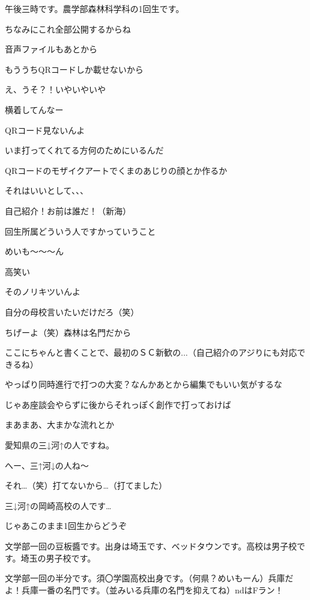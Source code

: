 \begin{multicols}{2}
  午後三時です。農学部森林科学科の1回生です。

  ちなみにこれ全部公開するからね

  音声ファイルもあとから

  もううちQRコードしか載せないから

  え、うそ？！いやいやいや

  横着してんなー

  QRコード見ないんよ

  いま打ってくれてる方何のためにいるんだ

  QRコードのモザイクアートでくまのあじりの顔とか作るか

  それはいいとして、、、

  自己紹介！お前は誰だ！（新海）

  回生所属どういう人ですかっていうこと

  めいも～～～ん

  高笑い

  そのノリキツいんよ

  自分の母校言いたいだけだろ（笑）

  ちげーよ（笑）森林は名門だから

  ここにちゃんと書くことで、最初のＳＣ新歓の...（自己紹介のアジりにも対応できるね）

  やっぱり同時進行で打つの大変？なんかあとから編集でもいい気がするな

  じゃあ座談会やらずに後からそれっぽく創作で打っておけば

  まあまあ、大まかな流れとか

  愛知県の三↓河↑の人ですね。

  へー、三↑河↓の人ね～

  それ…（笑）打てないから…（打てました）

  三↓河↑の岡崎高校の人です…

  じゃあこのまま1回生からどうぞ

  文学部一回の豆板醬です。出身は埼玉です、ベッドタウンです。高校は男子校です。埼玉の男子校です。

  文学部一回の半分です。須〇学園高校出身です。（何県？めいもーん）兵庫だよ！兵庫一番の名門です。（並みいる兵庫の名門を抑えてね）ndはFラン！


\end{multicols}
